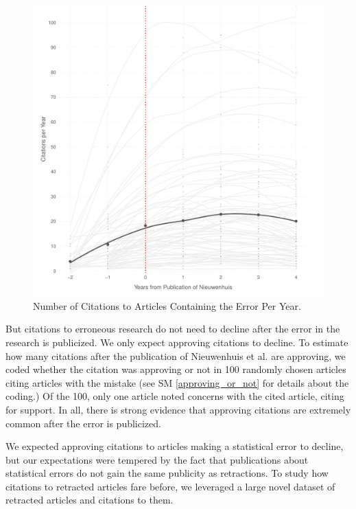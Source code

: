 \documentclass[12pt]{article}
\begin{document}
\begin{figure}[h]
\centering
\includegraphics[scale=.7]{../figs/nw_growth_curve.pdf}
\caption{Number of Citations to Articles Containing the Error Per Year.}
\label{fig:niewenhuis}
\end{figure}

But citations to erroneous research do not need to decline after the error in the research is publicized. We only expect approving citations to decline. To estimate how many citations after the publication of Nieuwenhuis et al. are approving, we coded whether the citation was approving or not in 100 randomly chosen articles citing articles with the mistake (see SM \ref{approving_or_not} for details about the coding.) Of the 100, only one article noted concerns with the cited article, citing \cite{nieuwenhuis2011} for support. In all, there is strong evidence that approving citations are extremely common after the error is publicized.

We expected approving citations to articles making a statistical error to decline, but our expectations were tempered by the fact that publications about statistical errors do not gain the same publicity as retractions. To study how citations to retracted articles fare before, we leveraged a large novel dataset of retracted articles and citations to them. 
\end{document}

